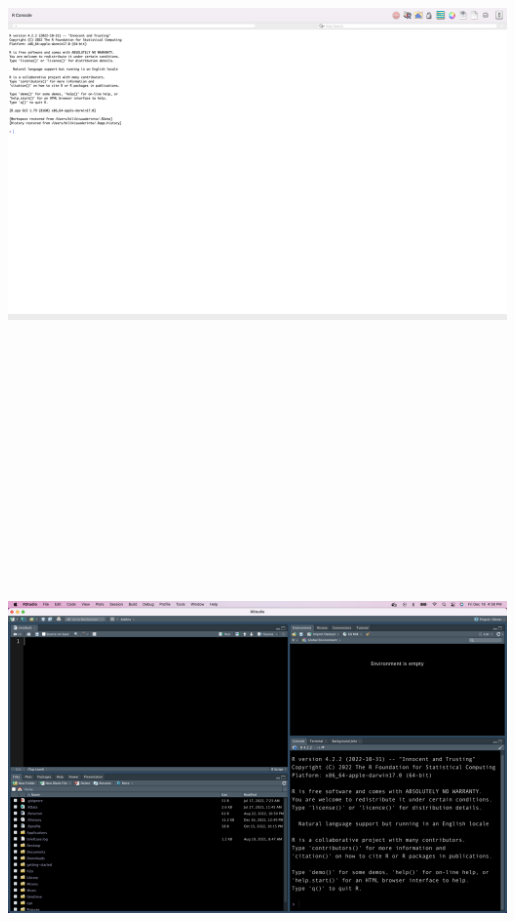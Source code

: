 \documentclass[
  letterpaper,
  DIV=11,
  numbers=noendperiod]{scrartcl}
\begin{document}
\includegraphics[width=5.19792in,height=5.97917in]{images/r-console.png}

\includegraphics[width=5.19792in,height=5.97917in]{images/rstudio-ide-2.png}
\end{document}
